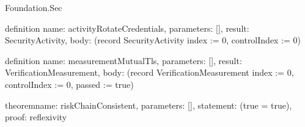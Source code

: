 \begin{lexlean}{Foundation.Sec}
\begin{semanticmodule}
definition{
  name: activityRotateCredentials,
  parameters: [],
  result: SecurityActivity,
  body: (record SecurityActivity {index := 0, controlIndex := 0})
}

definition{
  name: measurementMutualTls,
  parameters: [],
  result: VerificationMeasurement,
  body: (record VerificationMeasurement {index := 0, controlIndex := 0, passed := true})
}

theorem{name: riskChainConsistent, parameters: [], statement: (true = true), proof: reflexivity{}}
\end{semanticmodule}
\end{lexlean}
